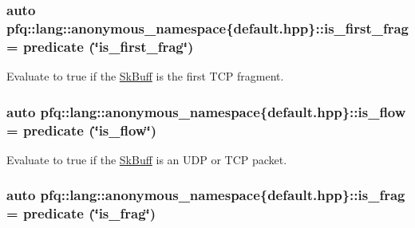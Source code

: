 \subsubsection[{\texorpdfstring{is\+\_\+first\+\_\+frag}{is_first_frag}}]{\setlength{\rightskip}{0pt plus 5cm}auto pfq\+::lang\+::anonymous\+\_\+namespace\{default.\+hpp\}\+::is\+\_\+first\+\_\+frag = {\bf predicate} (\char`\"{}is\+\_\+first\+\_\+frag\char`\"{})}\hypertarget{namespacepfq_1_1lang_1_1anonymous__namespace_02default_8hpp_03_afb797cc442d04e614a9ac68c7c4c35ff}{}\label{namespacepfq_1_1lang_1_1anonymous__namespace_02default_8hpp_03_afb797cc442d04e614a9ac68c7c4c35ff}


Evaluate to {\ttfamily true} if the \hyperlink{structpfq_1_1lang_1_1SkBuff}{Sk\+Buff} is the first T\+CP fragment. 

\subsubsection[{\texorpdfstring{is\+\_\+flow}{is_flow}}]{\setlength{\rightskip}{0pt plus 5cm}auto pfq\+::lang\+::anonymous\+\_\+namespace\{default.\+hpp\}\+::is\+\_\+flow = {\bf predicate} (\char`\"{}is\+\_\+flow\char`\"{})}\hypertarget{namespacepfq_1_1lang_1_1anonymous__namespace_02default_8hpp_03_ae52890434121a999589d48bccae3c3e2}{}\label{namespacepfq_1_1lang_1_1anonymous__namespace_02default_8hpp_03_ae52890434121a999589d48bccae3c3e2}


Evaluate to {\ttfamily true} if the \hyperlink{structpfq_1_1lang_1_1SkBuff}{Sk\+Buff} is an U\+DP or T\+CP packet. 

\subsubsection[{\texorpdfstring{is\+\_\+frag}{is_frag}}]{\setlength{\rightskip}{0pt plus 5cm}auto pfq\+::lang\+::anonymous\+\_\+namespace\{default.\+hpp\}\+::is\+\_\+frag = {\bf predicate} (\char`\"{}is\+\_\+frag\char`\"{})}\hypertarget{namespacepfq_1_1lang_1_1anonymous__namespace_02default_8hpp_03_af042e092c925ae6306ae85ae5a56563d}{}\label{namespacepfq_1_1lang_1_1anonymous__namespace_02default_8hpp_03_af042e092c925ae6306ae85ae5a56563d}


